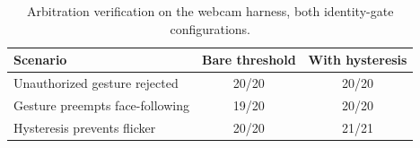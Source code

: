 \begin{table}[t]
\caption{Arbitration verification on the webcam harness, both identity-gate configurations.}
\label{tab:webcam}
\centering
\footnotesize
\setlength{\tabcolsep}{4pt}
\renewcommand{\arraystretch}{1.02}
\begin{tabular}{@{}lcc@{}}
\toprule
Scenario & Bare threshold & With hysteresis \\
\midrule
Unauthorized gesture rejected & 20/20 & 20/20 \\
Gesture preempts face-following & 19/20 & 20/20 \\
Hysteresis prevents flicker & 20/20 & 21/21 \\
\bottomrule
\end{tabular}
\end{table}
